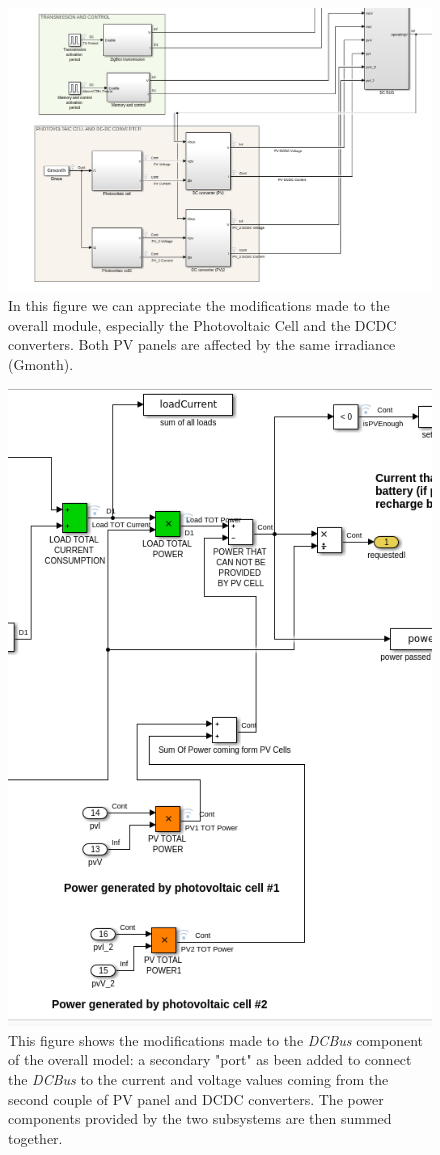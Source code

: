 \documentclass[a4paper]{article}
\begin{document}
        \begin{figure}[htp]
            \centering
            \includegraphics[width=0.6 \columnwidth]{./screenshots/SecondPart/2Minutes/Gmonth/ModelOverall.png}
            \caption{
                    \label{fig:ModelOverall}
                    In this figure we can appreciate the modifications made to the overall module, especially the Photovoltaic Cell and the DCDC converters. Both PV panels are affected by the same irradiance (Gmonth).
            }
        \end{figure}

        \begin{figure}[htp]
            \centering
            \includegraphics[width=0.6 \columnwidth]{./screenshots/SecondPart/2Minutes/Gmonth/DCBus.png}
            \caption{
                    \label{fig:DCBus}
                    This figure shows the modifications made to the \emph{DCBus} component of the overall model: a secondary "port" as been added to connect the \emph{DCBus} to the current and voltage values coming from the second couple of PV panel and DCDC converters. The power components provided by the two subsystems are then summed together.
            }
        \end{figure}
\end{document}
